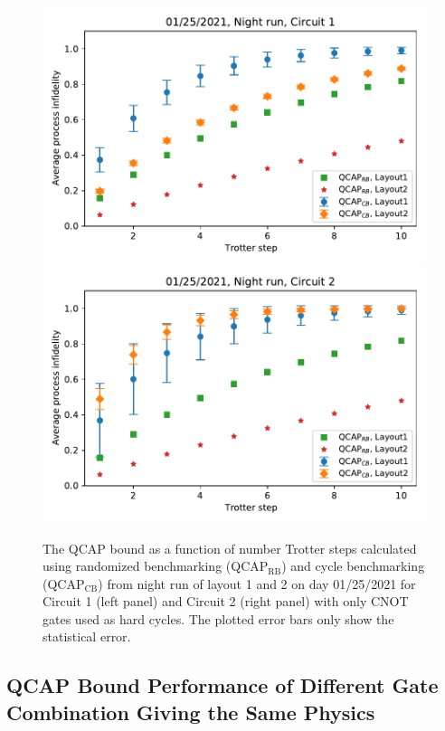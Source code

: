 \begin{figure}[H]
    \includegraphics[scale=0.55]{QCAP_CB_RB_Data_01_25_2021_Layout_1_2C1_Night.pdf}
    \includegraphics[scale=0.55]{QCAP_CB_RB_Data_01_25_2021_Layout_1_2C2_Night.pdf}
    \caption{The QCAP bound as a function of number Trotter steps calculated using randomized benchmarking (QCAP$_{\text{RB}}$) and cycle  benchmarking (QCAP$_{\text{CB}}$) from night run of layout 1 and 2 on day 01/25/2021 for Circuit 1 (left panel) and Circuit 2 (right panel) with only CNOT gates used as hard cycles. The  plotted  error  bars  only show the statistical error.}
    \label{fig:QCAP_circ1_circ2_25th_L1L2_Night}
\end{figure}





\subsection{QCAP Bound Performance of Different Gate Combination Giving the Same Physics}
\label{sec:circ1_vs_circ2_QCAP}

